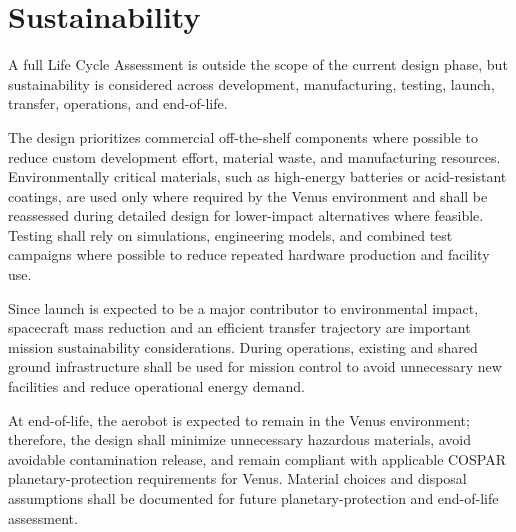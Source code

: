 \section{Sustainability}
\label{sec:sustainability}

A full Life Cycle Assessment is outside the scope of the current design phase, but sustainability is considered across development, manufacturing, testing, launch, transfer, operations, and end-of-life.

The design prioritizes commercial off-the-shelf components where possible to reduce custom development effort, material waste, and manufacturing resources. Environmentally critical materials, such as high-energy batteries or acid-resistant coatings, are used only where required by the Venus environment and shall be reassessed during detailed design for lower-impact alternatives where feasible. Testing shall rely on simulations, engineering models, and combined test campaigns where possible to reduce repeated hardware production and facility use.

Since launch is expected to be a major contributor to environmental impact, spacecraft mass reduction and an efficient transfer trajectory are important mission sustainability considerations. During operations, existing and shared ground infrastructure shall be used for mission control to avoid unnecessary new facilities and reduce operational energy demand. 

At end-of-life, the aerobot is expected to remain in the Venus environment; therefore, the design shall minimize unnecessary hazardous materials, avoid avoidable contamination release, and remain compliant with applicable COSPAR planetary-protection requirements \cite{ECSS_U_ST_20C_2019} for Venus. Material choices and disposal assumptions shall be documented for future planetary-protection and end-of-life assessment.